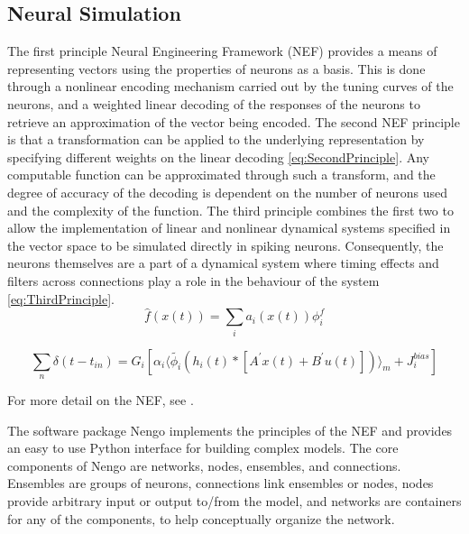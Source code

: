 \documentclass[letterpaper, 10 pt, conference]{ieeeconf}  %
\begin{document}
\subsection{Neural Simulation}

The first principle Neural Engineering Framework (NEF)\cite{eliasmith2004neural} provides a means of representing vectors using the properties of neurons as a basis.
This is done through a nonlinear encoding mechanism carried out by the tuning curves of the neurons, and a weighted linear decoding of the responses of the neurons to retrieve an approximation of the vector being encoded.
The second NEF principle is that a transformation can be applied to the underlying representation by specifying different weights on the linear decoding \eqref{eq:SecondPrinciple}. 
Any computable function can be approximated through such a transform, and the degree of accuracy of the decoding is dependent on the number of neurons used and the complexity of the function.
The third principle combines the first two to allow the implementation of linear and nonlinear dynamical systems specified in the vector space to be simulated directly in spiking neurons.
Consequently, the neurons themselves are a part of a dynamical system where timing effects and filters across connections play a role in the behaviour of the system \eqref{eq:ThirdPrinciple}. 
\begin{equation} \label{eq:SecondPrinciple}
\hat{f}(x(t)) = \sum_{i} a_{i} (x(t)) \phi_{i}^{f}
\end{equation}

\begin{equation} \label{eq:ThirdPrinciple}
\sum_{n} \delta (t - t_{in}) = G_{i} [ \alpha_{i} \langle \tilde{\phi_{i}} (h_{i} (t) * [ A^{\prime} x(t) + B^{\prime} u(t)]) \rangle_{m} + J_{i}^{bias}]
\end{equation}

For more detail on the NEF, see \cite{eliasmith2004neural}.%

The software package Nengo \cite{bekolay2013nengo} implements the principles of the NEF and provides an easy to use Python interface for building complex models.
The core components of Nengo are networks, nodes, ensembles, and connections.
Ensembles are groups of neurons, connections link ensembles or nodes, nodes provide arbitrary input or output to/from the model, and networks are containers for any of the components, to help conceptually organize the network.
\end{document}
